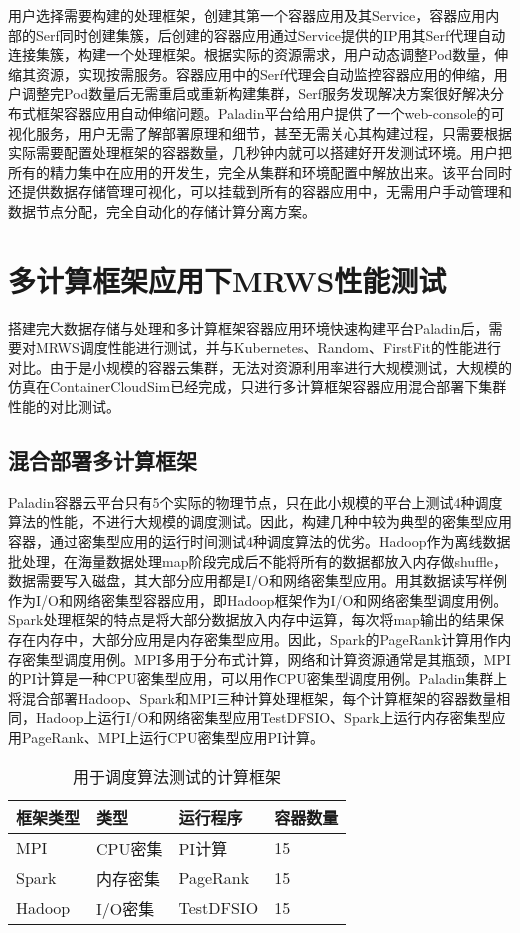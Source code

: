 用户选择需要构建的处理框架，创建其第一个容器应用及其Service，容器应用内部的Serf同时创建集簇，后创建的容器应用通过Service提供的IP用其Serf代理自动连接集簇，构建一个处理框架。根据实际的资源需求，用户动态调整Pod数量，伸缩其资源，实现按需服务。容器应用中的Serf代理会自动监控容器应用的伸缩，用户调整完Pod数量后无需重启或重新构建集群，Serf服务发现解决方案很好解决分布式框架容器应用自动伸缩问题。Paladin平台给用户提供了一个web-console的可视化服务，用户无需了解部署原理和细节，甚至无需关心其构建过程，只需要根据实际需要配置处理框架的容器数量，几秒钟内就可以搭建好开发测试环境。用户把所有的精力集中在应用的开发生，完全从集群和环境配置中解放出来。该平台同时还提供数据存储管理可视化，可以挂载到所有的容器应用中，无需用户手动管理和数据节点分配，完全自动化的存储计算分离方案。

\section{多计算框架应用下MRWS性能测试}
搭建完大数据存储与处理和多计算框架容器应用环境快速构建平台Paladin后，需要对MRWS调度性能进行测试，并与Kubernetes、Random、FirstFit的性能进行对比。由于是小规模的容器云集群，无法对资源利用率进行大规模测试，大规模的仿真在ContainerCloudSim已经完成，只进行多计算框架容器应用混合部署下集群性能的对比测试。

\subsection{混合部署多计算框架}
Paladin容器云平台只有5个实际的物理节点，只在此小规模的平台上测试4种调度算法的性能，不进行大规模的调度测试。因此，构建几种中较为典型的密集型应用容器，通过密集型应用的运行时间测试4种调度算法的优劣。Hadoop作为离线数据批处理，在海量数据处理map阶段完成后不能将所有的数据都放入内存做shuffle，数据需要写入磁盘，其大部分应用都是I/O和网络密集型应用。用其数据读写样例作为I/O和网络密集型容器应用，即Hadoop框架作为I/O和网络密集型调度用例。Spark处理框架的特点是将大部分数据放入内存中运算，每次将map输出的结果保存在内存中，大部分应用是内存密集型应用。因此，Spark的PageRank计算用作内存密集型调度用例。MPI多用于分布式计算，网络和计算资源通常是其瓶颈，MPI的PI计算是一种CPU密集型应用，可以用作CPU密集型调度用例。Paladin集群上将混合部署Hadoop、Spark和MPI三种计算处理框架，每个计算框架的容器数量相同，Hadoop上运行I/O和网络密集型应用TestDFSIO、Spark上运行内存密集型应用PageRank、MPI上运行CPU密集型应用PI计算。
\begin{table}[H]
	\centering\dawu[1.3]
	\caption{用于调度算法测试的计算框架}
	\begin{tabular}{|p{2.5cm}<{\centering}|p{2.5cm}<{\centering}|p{2.5cm}<{\centering}|p{2.5cm}<{\centering}|} \hline
		框架类型 & 类型 & 运行程序 & 容器数量 \\ \hline
		MPI & CPU密集 & PI计算 & 15 \\ \hline
		Spark & 内存密集 & PageRank & 15  \\ \hline
		Hadoop & I/O密集 & TestDFSIO & 15  \\ \hline
	\end{tabular}
\end{table}

